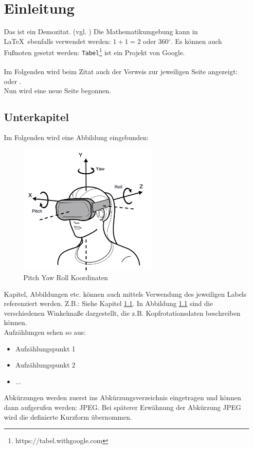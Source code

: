 \chapter{Einleitung}
\begin{spacing}{1.1}
	
\noindent Das ist ein Demozitat. (vgl. \cite{link:oculus_headtracking_sensors}) Die Mathematikumgebung kann in \LaTeX\ ebenfalls verwendet werden: $1+1=2$ oder 360$^{\circ}$.
Es können auch Fußnoten gesetzt werden: \texttt{Tabel}\footnote{https://tabel.withgoogle.com} ist ein Projekt von Google. \\ \\
Im Folgenden wird beim Zitat auch der Verweis zur jeweiligen Seite angezeigt: \cite[S. 1]{book:gibson1986ecological} oder \cite[S. 2-4]{corbillon2016viewport}. \\
Nun wird eine neue Seite begonnen. \newpage

\section{Unterkapitel}
\label{sec:unterkapitel1}
Im Folgenden wird eine Abbildung eingebunden:
\begin{figure}[!h]
	\centering
	\includegraphics[width=7cm]{images/pyr_coordinates.jpg}
	\caption{Pitch Yaw Roll Koordinaten \cite{link:oculus_headtracking_sensors}}
	\label{picture:pyr_coordinates}
\end{figure}

\noindent Kapitel, Abbildungen etc. können auch mittels Verwendung des jeweiligen Labels referenziert werden. Z.B.: Siehe Kapitel \ref{sec:unterkapitel1}. In Abbildung \ref{picture:pyr_coordinates} sind die verschiedenen Winkelmaße dargestellt, die z.B. Kopfrotationsdaten beschreiben können. \\
Aufzählungen sehen so aus:
\begin{itemize}
	\setlength\itemsep{0.1em}
	\item Aufzählungspunkt 1
	\item Aufzählungspunkt 2
	\item ...
\end{itemize}
Abkürzungen werden zuerst ins Abkürzungsverzeichnis eingetragen und können dann aufgerufen werden: \ac{JPEG}. Bei späterer Erwähnung der Abkürzung \ac{JPEG} wird die definierte Kurzform übernommen.


\end{spacing}
